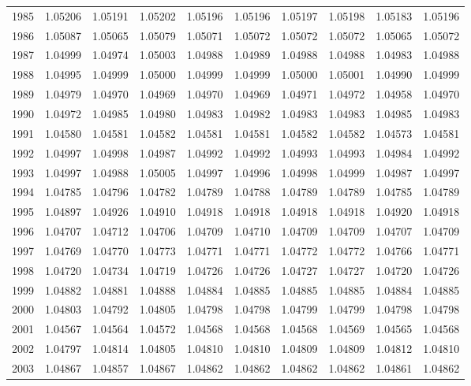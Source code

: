 \begin{tabular}{cccccccccc}
  1985 & 1.05206 & 1.05191 & 1.05202 & 1.05196 & 1.05196 & 1.05197 & 1.05198 & 1.05183 & 1.05196 \\ 
  1986 & 1.05087 & 1.05065 & 1.05079 & 1.05071 & 1.05072 & 1.05072 & 1.05072 & 1.05065 & 1.05072 \\ 
  1987 & 1.04999 & 1.04974 & 1.05003 & 1.04988 & 1.04989 & 1.04988 & 1.04988 & 1.04983 & 1.04988 \\ 
  1988 & 1.04995 & 1.04999 & 1.05000 & 1.04999 & 1.04999 & 1.05000 & 1.05001 & 1.04990 & 1.04999 \\ 
  1989 & 1.04979 & 1.04970 & 1.04969 & 1.04970 & 1.04969 & 1.04971 & 1.04972 & 1.04958 & 1.04970 \\ 
  1990 & 1.04972 & 1.04985 & 1.04980 & 1.04983 & 1.04982 & 1.04983 & 1.04983 & 1.04985 & 1.04983 \\ 
  1991 & 1.04580 & 1.04581 & 1.04582 & 1.04581 & 1.04581 & 1.04582 & 1.04582 & 1.04573 & 1.04581 \\ 
  1992 & 1.04997 & 1.04998 & 1.04987 & 1.04992 & 1.04992 & 1.04993 & 1.04993 & 1.04984 & 1.04992 \\ 
  1993 & 1.04997 & 1.04988 & 1.05005 & 1.04997 & 1.04996 & 1.04998 & 1.04999 & 1.04987 & 1.04997 \\ 
  1994 & 1.04785 & 1.04796 & 1.04782 & 1.04789 & 1.04788 & 1.04789 & 1.04789 & 1.04785 & 1.04789 \\ 
  1995 & 1.04897 & 1.04926 & 1.04910 & 1.04918 & 1.04918 & 1.04918 & 1.04918 & 1.04920 & 1.04918 \\ 
  1996 & 1.04707 & 1.04712 & 1.04706 & 1.04709 & 1.04710 & 1.04709 & 1.04709 & 1.04707 & 1.04709 \\ 
  1997 & 1.04769 & 1.04770 & 1.04773 & 1.04771 & 1.04771 & 1.04772 & 1.04772 & 1.04766 & 1.04771 \\ 
  1998 & 1.04720 & 1.04734 & 1.04719 & 1.04726 & 1.04726 & 1.04727 & 1.04727 & 1.04720 & 1.04726 \\ 
  1999 & 1.04882 & 1.04881 & 1.04888 & 1.04884 & 1.04885 & 1.04885 & 1.04885 & 1.04884 & 1.04885 \\ 
  2000 & 1.04803 & 1.04792 & 1.04805 & 1.04798 & 1.04798 & 1.04799 & 1.04799 & 1.04798 & 1.04798 \\ 
  2001 & 1.04567 & 1.04564 & 1.04572 & 1.04568 & 1.04568 & 1.04568 & 1.04569 & 1.04565 & 1.04568 \\ 
  2002 & 1.04797 & 1.04814 & 1.04805 & 1.04810 & 1.04810 & 1.04809 & 1.04809 & 1.04812 & 1.04810 \\ 
  2003 & 1.04867 & 1.04857 & 1.04867 & 1.04862 & 1.04862 & 1.04862 & 1.04862 & 1.04861 & 1.04862 \\ 

\end{tabular}
